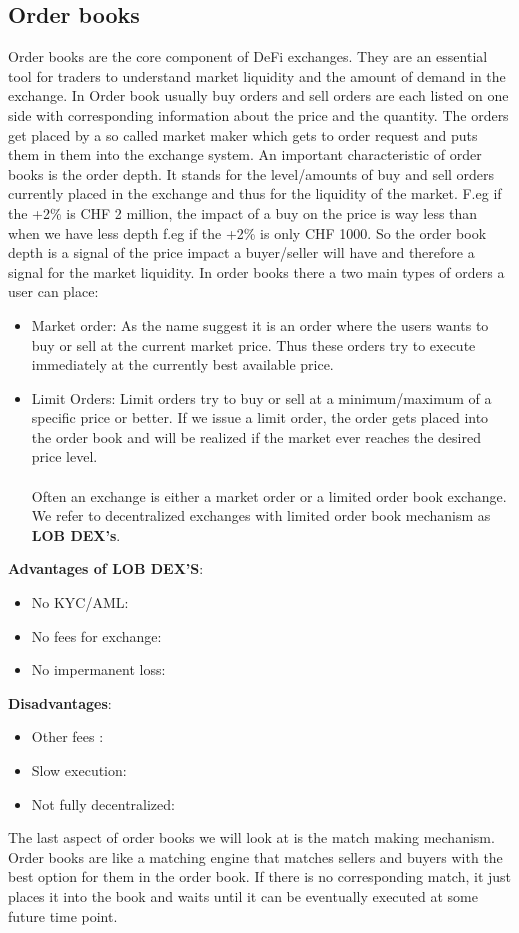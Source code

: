 \documentclass{article}
\begin{document}
\subsection{Order books}
Order books are the core component of DeFi exchanges. They are an essential tool for traders to understand market liquidity and the amount of demand in the exchange. In Order book usually buy orders and sell orders are each listed on one side with corresponding information about the price and the quantity. The orders get placed by a so called market maker which gets to order request and puts them in them into the exchange system. An important characteristic of order books is the order depth. It stands for the level/amounts of buy and sell orders currently placed in the exchange and thus for the liquidity of the market. F.eg if the +2\% is CHF 2 million, the impact of a buy on the price is way less than when we have less depth f.eg if  the +2\% is only CHF 1000. So the order book depth is a signal of the price impact a buyer/seller will have and therefore a signal for the market liquidity. In order books there a two main types of orders a user can place:
\begin{itemize}
    \item {Market order}: As the name suggest it is an order where the users wants to buy or sell at the current market price. Thus these orders try to execute immediately at the currently best available price.
    \item {Limit Orders}: Limit orders try to buy or sell at a minimum/maximum of a specific price or better. If we issue a limit order, the order gets placed into the order book and will be realized if the market ever reaches the desired price level.\\
    \\
    Often an exchange is either a market order or a limited order book exchange. We refer to decentralized exchanges with limited order book mechanism as \textbf{LOB DEX's}.
\end{itemize}

\textbf{Advantages of LOB DEX'S}:
\begin{itemize}
    \item {No KYC/AML}: 
    \item {No fees for exchange}: 
    \item {No impermanent loss}: 
\end{itemize}
\textbf{Disadvantages}:
\begin{itemize}
    \item {Other fees }: 
    \item {Slow execution}: 
    \item {Not fully decentralized}:  
\end{itemize}
The last aspect of order books we will look at is the match making mechanism. Order books are like a matching engine that matches sellers and buyers with the best option for them in the order book. If there is no corresponding match, it just places it into the book and waits until it can be eventually executed at some future time point.
\end{document}
